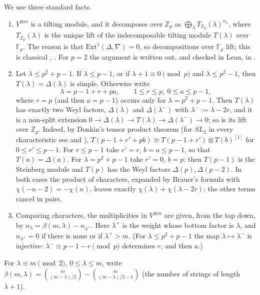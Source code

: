 \documentclass[10pt]{article}
\theoremstyle{ds}
\theoremstyle{dsrem}
\newcommand{\Z}{\mathbb{Z}}
\newcommand{\F}{\mathbb{F}}
\begin{document}
We use three standard facts.
\begin{enumerate}
\item[(T1)] $V^{\otimes m}$ is a tilting module, and it decomposes over $\Z_p$ as $\bigoplus_\lambda T_{\Z_p}(\lambda)^{n_\lambda}$, where $T_{\Z_p}(\lambda)$ is the unique lift of the indecomposable tilting module $T(\lambda)$ over $\F_p$. The reason is that $\mathrm{Ext}^1(\Delta,\nabla)=0$, so decompositions over $\F_p$ lift; this is classical \cite[\S1.2]{And}, \cite[II.E.6, II.E.19--E.22]{Jan}. For $p=2$ the argument is written out, and checked in Lean, in \cite[Lemma~3.3, Corollary~3.4]{DST}.
\item[(T2)] Let $\lambda\le p^2+p-1$. If $\lambda\le p-1$, or if $\lambda+1\equiv0\pmod p$ and $\lambda\le p^2-1$, then $T(\lambda)=\Delta(\lambda)$ is simple. Otherwise write
\[
\lambda=p-1+r+pa,\qquad 1\le r\le p,\ 0\le a\le p-1,
\]
where $r=p$ (and then $a=p-1$) occurs only for $\lambda=p^2+p-1$. Then $T(\lambda)$ has exactly two Weyl factors, $\Delta(\lambda)$ and $\Delta(\lambda^-)$ with $\lambda^-:=\lambda-2r$, and it is a non-split extension $0\to\Delta(\lambda)\to T(\lambda)\to\Delta(\lambda^-)\to0$; so is its lift over $\Z_p$. Indeed, by Donkin's tensor product theorem \cite[Prop.~2.1]{Don} (for $SL_2$ in every characteristic see \cite[Prop.~3.4(a)]{STWZ} and \cite[Remark~1.1(ii)]{And}), $T(p-1+r'+pb)\cong T(p-1+r')\otimes T(b)^{[1]}$ for $0\le r'\le p-1$. For $r\le p-1$ take $r'=r$, $b=a\le p-1$, so that $T(a)=\Delta(a)$. For $\lambda=p^2+p-1$ take $r'=0$, $b=p$: then $T(p-1)$ is the Steinberg module and $T(p)$ has the Weyl factors $\Delta(p),\Delta(p-2)$. In both cases the product of characters, expanded by Brauer's formula with $\chi(-n-2)=-\chi(n)$, leaves exactly $\chi(\lambda)+\chi(\lambda-2r)$; the other terms cancel in pairs.
\item[(T3)] Comparing characters, the multiplicities in $V^{\otimes m}$ are given, from the top down, by $n_\lambda=\beta(m,\lambda)-n_{\lambda^+}$. Here $\lambda^+$ is the weight whose bottom factor is $\lambda$, and $n_{\lambda^+}=0$ if there is none or if $\lambda^+>m$. (For $\lambda\le p^2+p-1$ the map $\lambda\mapsto\lambda^-$ is injective: $\lambda^-\equiv p-1-r\pmod p$ determines $r$, and then $a$.)
\end{enumerate}

For $\lambda\equiv m\pmod 2$, $0\le\lambda\le m$, write $\beta(m,\lambda)=\binom{m}{(m-\lambda)/2}-\binom m{(m-\lambda)/2-1}$ (the number of strings of length $\lambda+1$).
\end{document}
